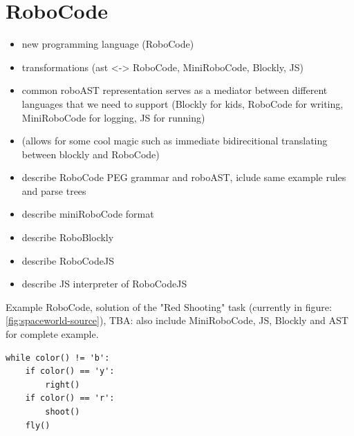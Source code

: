 \section{RoboCode}

\begin{itemize}
\item new programming language (RoboCode)
\item transformations (ast <-> RoboCode, MiniRoboCode, Blockly, JS)
\item common roboAST representation serves as a mediator between different languages
      that we need to support (Blockly for kids, RoboCode for writing,
      MiniRoboCode for logging, JS for running)
\item (allows for some cool magic such as immediate bidirecitional translating between blockly and RoboCode)
\item describe RoboCode PEG grammar and roboAST, iclude same example rules and parse trees
\item describe miniRoboCode format
\item describe RoboBlockly
\item describe RoboCodeJS
\item describe JS interpreter of RoboCodeJS
\end{itemize}

Example RoboCode, solution of the "Red Shooting" task (currently in figure: \ref{fig:spaceworld-source}), TBA: also include MiniRoboCode, JS, Blockly and AST for complete example.

\begin{lstlisting}
while color() != 'b':
    if color() == 'y':
        right()
    if color() == 'r':
        shoot()
    fly()
\end{lstlisting}
